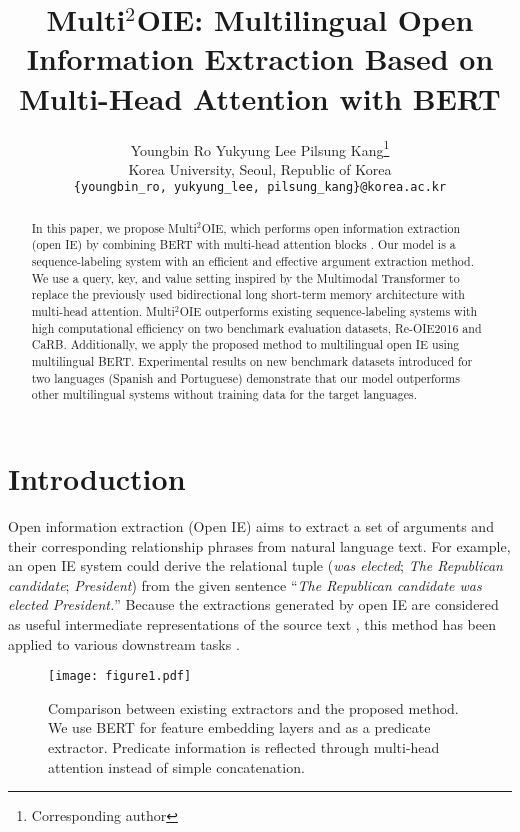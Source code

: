 \documentclass[11pt,a4paper]{article}
\title{Multi$^2$OIE: Multilingual Open Information Extraction Based on Multi-Head Attention with BERT}
\author
{
  Youngbin Ro \quad Yukyung Lee \quad Pilsung Kang\thanks{\; Corresponding author} \\
  Korea University, Seoul, Republic of Korea \\
  \texttt{\{youngbin\_ro, yukyung\_lee, pilsung\_kang\}@korea.ac.kr}
}
\begin{document}
\maketitle
\begin{abstract}
In this paper, we propose Multi$^2$OIE, which performs open information extraction (open IE) by combining BERT \citep{devlin-etal-2019-bert} with multi-head attention blocks \citep{10.5555/3295222.3295349}.
Our model is a sequence-labeling system with an efficient and effective argument extraction method.
We use a query, key, and value setting inspired by the Multimodal Transformer \citep{tsai-etal-2019-multimodal} to replace the previously used bidirectional long short-term memory architecture with multi-head attention.
Multi$^2$OIE outperforms existing sequence-labeling systems with high computational efficiency on two benchmark evaluation datasets, Re-OIE2016 and CaRB.
Additionally, we apply the proposed method to multilingual open IE using multilingual BERT.
Experimental results on new benchmark datasets introduced for two languages (Spanish and Portuguese) demonstrate that our model outperforms other multilingual systems without training data for the target languages.
\end{abstract}

\section{Introduction}
Open information extraction (Open IE) \citep{10.5555/1625275.1625705} aims to extract a set of arguments and their corresponding relationship phrases from natural language text.
For example, an open IE system could derive the relational tuple (\emph{was elected}; \emph{The Republican candidate}; \emph{President}) from the given sentence ``\emph{The Republican candidate was elected President.}''
Because the extractions generated by open IE are considered as useful intermediate representations of the source text \citep{10.5555/3061053.3061220}, this method has been applied to various downstream tasks \citep{christensen-etal-2013-towards,ding-etal-2016-knowledge,khot-etal-2017-answering,10.1145/3269206.3271707}.

\begin{figure}[t]
\texttt{[image: figure1.pdf]}
\caption
{
Comparison between existing extractors and the proposed method.
We use BERT for feature embedding layers and as a predicate extractor.
Predicate information is reflected through multi-head attention instead of simple concatenation.
}
\label{fig:1}
\centering
\end{figure}
\end{document}
